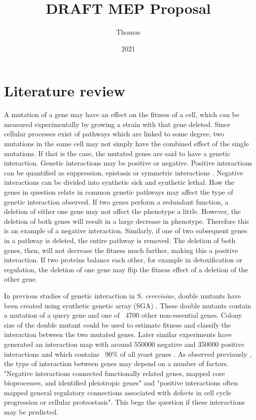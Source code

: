\documentclass{article}
\title{DRAFT MEP Proposal}
\author{Thomas}
\date{2021}
\begin{document}
\maketitle

\section{Literature review}

A mutation of a gene may have an effect on the fitness of a cell, which can be measured experimentally by growing a strain with that gene deleted. Since cellular processes exist of pathways which are linked to some degree, two mutations in the same cell may not simply have the combined effect of the single mutations. If that is the case, the mutated genes are said to have a genetic interaction. Genetic interactions may be positive or negative. Positive interactions can be quantified as suppression, epistasis or symmetric interactions \cite{Constanzo2013}. Negative interactions can be divided into synthetic sick and synthetic lethal. How the genes in question relate in common genetic pathways may affect the type of genetic interaction observed. If two genes perform a redundant function, a deletion of either one gene may not affect the phenotype a little. However, the deletion of both genes will result in a large decrease in phenotype. Therefore this is an example of a negative interaction. Similarly, if one of two subsequent genes in a pathway is deleted, the entire pathway is removed. The deletion of both genes, then, will not decrease the fitness much further, making this a positive interaction. If two proteins balance each other, for example in detoxification or regulation, the deletion of one gene may flip the fitness effect of a deletion of the other gene.

In previous studies of genetic interaction in S. \textit{cerevisiae}, double mutants have been created using synthetic genetic array (SGA) \cite{Tong2001}. These double mutants contain a mutation of a query gene and one of ~4700 other non-essential genes. Colony size of the double mutant could be used to estimate fitness and classify the interaction between the two mutated genes. Later similar experiments have generated an interaction map with around 550000 negative and 350000 positive interactions and which contains ~90\% of all yeast genes \cite{Constanzo2016}. As observed previously \cite{Constanzo2010}, the type of interaction between genes may depend on a number of factors. "Negative interactions connected functionally related genes, mapped core bioprocesses, and identified pleiotropic genes" and "positive interactions often mapped general regulatory connections associated with defects in cell cycle progression or cellular proteostasis". This begs the question if these interactions may be predicted. 
\end{document}
